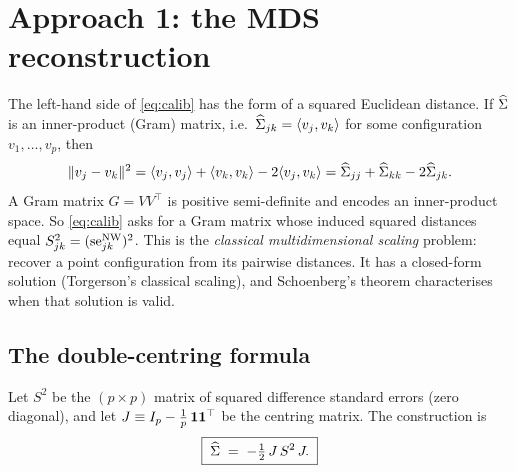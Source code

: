 \section{Approach 1: the MDS reconstruction}
\label{sec:mds}

The left-hand side of \eqref{eq:calib} has the form of a squared Euclidean distance. If
$\widehat{\Sigma}$ is an inner-product (Gram) matrix, i.e.\ $\widehat{\Sigma}_{jk} = \langle v_j,
v_k\rangle$ for some configuration $v_1,\dots,v_p$, then
\begin{equation}
  \|v_j - v_k\|^2
  = \langle v_j,v_j\rangle + \langle v_k,v_k\rangle - 2\langle v_j,v_k\rangle
  = \widehat{\Sigma}_{jj} + \widehat{\Sigma}_{kk} - 2\widehat{\Sigma}_{jk}.
\end{equation}
A Gram matrix $G = V V^\top$ is positive semi-definite and encodes an inner-product
space. So \eqref{eq:calib} asks for a Gram matrix whose induced squared distances equal
$S^2_{jk} = (\mathrm{se}^{\mathrm{NW}}_{jk})^2$. This is the \emph{classical multidimensional scaling}
problem: recover a point configuration from its pairwise distances. It has a
closed-form solution (Torgerson's classical scaling), and Schoenberg's theorem
characterises when that solution is valid.

\subsection{The double-centring formula}

Let $S^2$ be the $(p\times p)$ matrix of squared difference standard errors (zero
diagonal), and let $J \equiv I_p - \tfrac{1}{p}\,\mathbf{1}\mathbf{1}^\top$ be the centring matrix.
The construction is
\begin{equation}
  \boxed{\;\widehat{\Sigma} \;=\; -\tfrac{1}{2}\, J\, S^2\, J.\;}
  \label{eq:doublecentre}
\end{equation}

